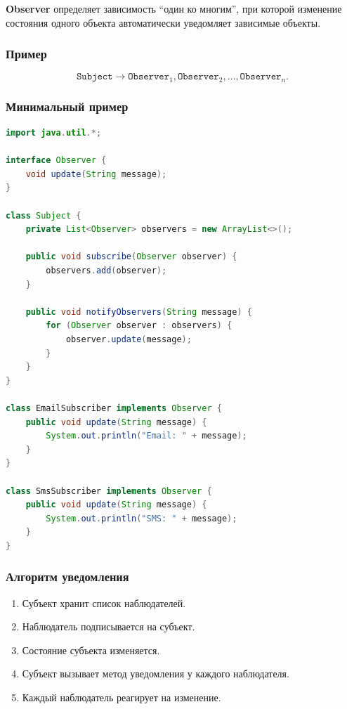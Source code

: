 \documentclass[12pt,a4paper]{article}
\begin{document}
\textbf{Observer} определяет зависимость ``один ко многим'', при которой изменение состояния одного объекта автоматически уведомляет зависимые объекты.

\subsubsection{Пример}

\[
\texttt{Subject} \rightarrow \texttt{Observer}_1, \texttt{Observer}_2, \dots, \texttt{Observer}_n.
\]

\subsubsection{Минимальный пример}

\begin{lstlisting}[language=Java,caption={Observer}]
import java.util.*;

interface Observer {
    void update(String message);
}

class Subject {
    private List<Observer> observers = new ArrayList<>();

    public void subscribe(Observer observer) {
        observers.add(observer);
    }

    public void notifyObservers(String message) {
        for (Observer observer : observers) {
            observer.update(message);
        }
    }
}

class EmailSubscriber implements Observer {
    public void update(String message) {
        System.out.println("Email: " + message);
    }
}

class SmsSubscriber implements Observer {
    public void update(String message) {
        System.out.println("SMS: " + message);
    }
}
\end{lstlisting}

\subsubsection{Алгоритм уведомления}

\begin{enumerate}
    \item Субъект хранит список наблюдателей.
    \item Наблюдатель подписывается на субъект.
    \item Состояние субъекта изменяется.
    \item Субъект вызывает метод уведомления у каждого наблюдателя.
    \item Каждый наблюдатель реагирует на изменение.
\end{enumerate}
\end{document}

